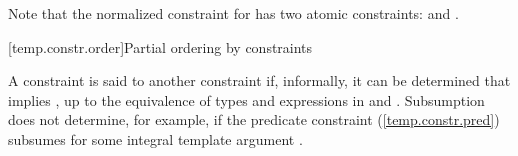 % 
Note that the normalized constraint for  has two atomic 
constraints:  and .
\exitexample




[temp.constr.order]{Partial ordering by constraints}

\pnum
A constraint  is said to  another constraint  
if, informally, it can be determined that  implies , up to 
the equivalence of types and expressions in  and .
% 
\enternote
Subsumption does not determine, for example, if the predicate 
constraint (\ref{temp.constr.pred})  subsumes 
 for some integral template argument .
\exitnote


